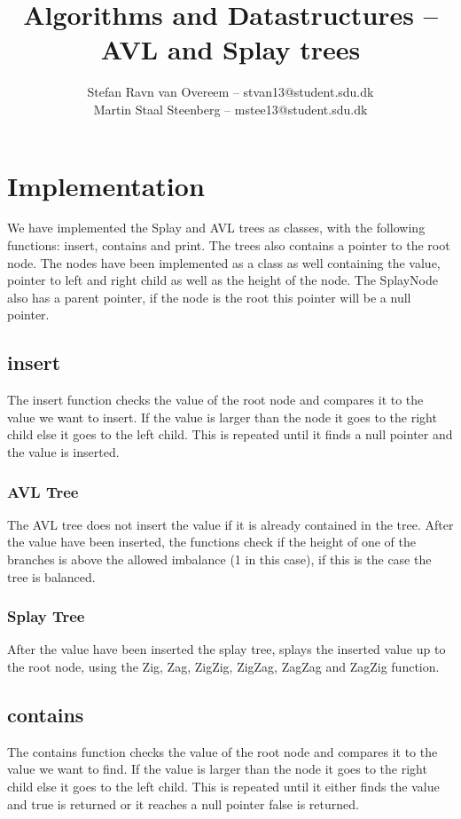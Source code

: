 \documentclass[a4paper,12pt,danish]{article}
\title{\textbf{Algorithms and Datastructures -- AVL and Splay trees}}
\author{Stefan Ravn van Overeem – stvan13@student.sdu.dk \\
		Martin Staal Steenberg – mstee13@student.sdu.dk}
\begin{document}
\maketitle
\section{Implementation}
	We have implemented the Splay and AVL trees as classes, with the following functions: insert, contains and print.
	The trees also contains a pointer to the root node. The nodes have been implemented as a class as well containing the value, pointer to left and right child as well as the height of the node. The SplayNode also has a parent pointer, if the node is the root this pointer will be a null pointer.
	
\subsection{insert}
The insert function checks the value of the root node and compares it to the value we want to insert. If the value is larger than the node it goes to the right child else it goes to the left child. This is repeated until it finds a null pointer and the value is inserted.

\subsubsection*{AVL Tree}
The AVL tree does not insert the value if it is already contained in the tree. After the value have been inserted, the functions check if the height of one of the branches is above the allowed imbalance (1 in this case), if this is the case the tree is balanced.

\subsubsection*{Splay Tree}
After the value have been inserted the splay tree, splays the inserted value up to the root node, using the Zig, Zag, ZigZig, ZigZag, ZagZag and ZagZig function.

\subsection{contains}
The contains function checks the value of the root node and compares it to the value we want to find. If the value is larger than the node it goes to the right child else it goes to the left child. This is repeated until it either finds the value and true is returned or it reaches a null pointer false is returned.
\end{document}
